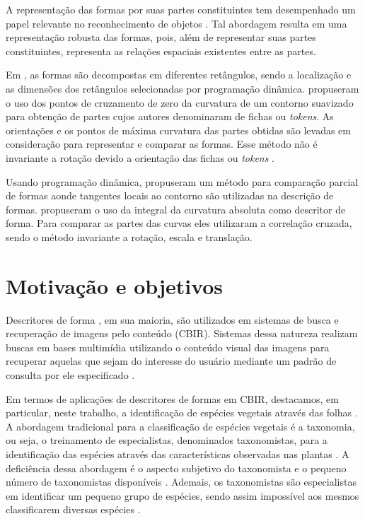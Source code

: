 A representação das formas por suas partes constituintes tem desempenhado um papel relevante no reconhecimento de objetos \cite{Ullman:1996}. Tal abordagem resulta em uma representação robusta das formas, pois, além de representar suas partes constituintes, representa as relações espaciais existentes entre as partes.  

Em , as formas são decompostas em diferentes retângulos, sendo a localização e as dimensões dos retângulos selecionadas por programação dinâmica.  propuseram o uso dos pontos de cruzamento de zero da curvatura de um contorno suavizado para obtenção de partes cujos autores denominaram de fichas ou \textit{tokens}. As orientações e os pontos de máxima curvatura das partes obtidas são levadas em consideração para representar e comparar as formas. Esse método não é invariante a rotação devido a orientação das fichas ou \textit{tokens} \cite{DiRuberto:2009}. 

Usando programação dinâmica,  propuseram um método para comparação parcial de formas aonde tangentes locais ao contorno são utilizadas na descrição de formas.  propuseram o uso da integral da curvatura absoluta como descritor de forma. Para comparar as partes das curvas eles utilizaram a correlação cruzada, sendo o método invariante a rotação, escala e translação.  

\section{Motivação e objetivos \label{sec:motiv_obj}}

Descritores de forma \cite{Belongie:2002, 1467513, Nanni20122254, Hu20123348, Latecki:2007, Wang2012134}, em sua maioria, são utilizados em sistemas de busca e recuperação de imagens pelo conteúdo (\ac{CBIR}). Sistemas dessa natureza realizam buscas em bases multimídia utilizando o conteúdo visual das imagens para recuperar aquelas que sejam do interesse do usuário mediante um padrão de consulta por ele especificado \cite{Feng:2003}. 

Em termos de aplicações de descritores de formas em \ac{CBIR}, destacamos, em particular, neste trabalho, a identificação de espécies vegetais através das folhas \cite{deSouza2016,
Fotopoulou:2013,Zhao20153203, Nam2008245, Wang:2000}. A abordagem tradicional para a classificação de espécies vegetais é a taxonomia, ou seja, o treinamento de especialistas, denominados taxonomistas, para a identificação das espécies através das características observadas nas plantas \cite{Cope20127562}. A deficiência dessa abordagem é o aspecto subjetivo do taxonomista \cite{JVS:JVS1441} e o pequeno número de taxonomistas disponíveis \cite{Cope20127562}. Ademais, os taxonomistas são especialistas em identificar um pequeno grupo de espécies, sendo assim impossível aos mesmos classificarem diversas espécies \cite{Cope20127562}.


